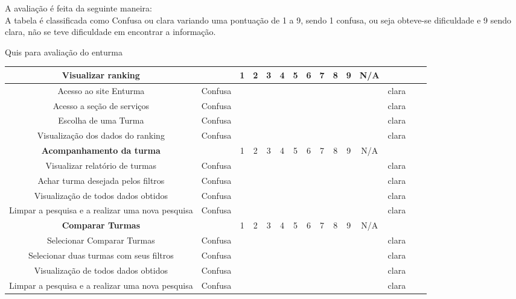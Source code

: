 \begin{itemize}
	A avaliação é feita da seguinte maneira:\\
		A tabela é classificada como Confusa ou clara variando uma pontuação de 1 a 9, sendo 1 confusa, ou seja  obteve-se dificuldade e 9 sendo clara, não se teve dificuldade em encontrar a informação.

		\begin{table}[H]
	{Quis para avaliação do enturma}
	\centering
	\begin{tabular}{|c|c|c|c|c|c|c|c|c|c|c|c|c|c|c|} 

		\hline
		   \textbf{Visualizar ranking} &  & 1 & 2 & 3 & 4 & 5 & 6 & 7 & 8 & 9 & N/A &  \\
		\hline
		   Acesso ao site Enturma & Confusa &  &  &  &  &  &  &  &  &  &  & clara \\ 
		\hline
		 Acesso a seção de serviços  & Confusa &  &  &  &  &  &  &  &  &  &  & clara \\ 
		\hline
		 Escolha de uma Turma  & Confusa &  &  &  &  &  &  &  &  &  &  & clara \\ 
		\hline
		 Visualização dos dados do ranking & Confusa &  &  &  &  &  &  &  &  &  &  & clara \\ 
		\hline
		   \textbf{Acompanhamento da turma} &  & 1 & 2 & 3 & 4 & 5 & 6 & 7 & 8 & 9 & N/A &  \\
		\hline
		 Visualizar relatório de turmas & Confusa &  &  &  &  &  &  &  &  &  &  & clara \\ 
		\hline
		  Achar turma desejada pelos filtros & Confusa &  &  &  &  &  &  &  &  &  &  & clara \\ 
		\hline
		  Visualização de todos dados obtidos & Confusa &  &  &  &  &  &  &  &  &  &  & clara \\ 
		\hline
		  Limpar a pesquisa e a realizar uma nova pesquisa & Confusa &  &  &  &  &  &  &  &  &  &  & clara \\ \hline
		\textbf{Comparar Turmas} &  & 1 & 2 & 3 & 4 & 5 & 6 & 7 & 8 & 9 & N/A &  \\
		\hline  
		  Selecionar Comparar Turmas & Confusa &  &  &  &  &  &  &  &  &  &  & clara \\ 
		\hline
		  Selecionar duas turmas com seus filtros & Confusa &  &  &  &  &  &  &  &  &  &  & clara \\ 
		\hline
		 Visualização de todos dados obtidos & Confusa &  &  &  &  &  &  &  &  &  &  & clara \\ 
		\hline
		Limpar a pesquisa e a realizar uma nova pesquisa & Confusa &  &  &  &  &  &  &  &  &  &  & clara \\ 

\end{tabular}
\end{table}
\end{itemize}
